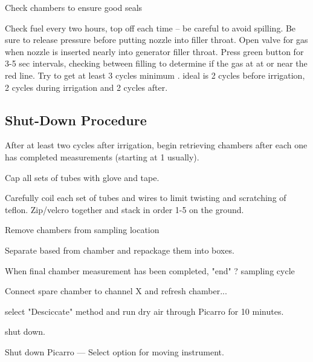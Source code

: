 \documentclass[12pt]{../SOP3_alpha}
\begin{document}
\NP Check chambers to ensure good seals
                               
\NP Check fuel every two hours, top off each time -- be careful to avoid spilling. Be sure to release pressure before putting nozzle into filler throat. Open valve for gas when nozzle is inserted nearly into generator filler throat. Press green button for 3-5 sec intervals, checking between filling to determine if the gas at at or near the red line.
                               Try to get at least 3 cycles minimum . ideal is 2 cycles before irrigation, 2 cycles during irrigation and 2 cycles after. 
                               
\subsection{Shut-Down Procedure}
                               
\NP After at least two cycles after irrigation, begin retrieving chambers after each one has completed measurements (starting at 1 usually).
                               
                               \NP Cap all sets of tubes with glove and tape.
                               
                               \NP Carefully coil each set of tubes and wires to limit twisting and scratching of teflon. Zip/velcro together and stack in order 1-5 on the ground. 
                               
                               \NP Remove chambers from sampling location
                               
                               \NP Separate based from chamber and repackage them into boxes.
                               
                               \NP When final chamber measurement has been completed, "end" ? sampling cycle
                               
                               \NP Connect spare chamber to channel X and refresh chamber... 
                               
                               \NP select "Desciccate" method and run dry air through Picarro for 10 minutes.
                               
                               \NP shut down.
                               
                               \NP Shut down Picarro --- Select option for moving instrument.
                               
\end{document}
